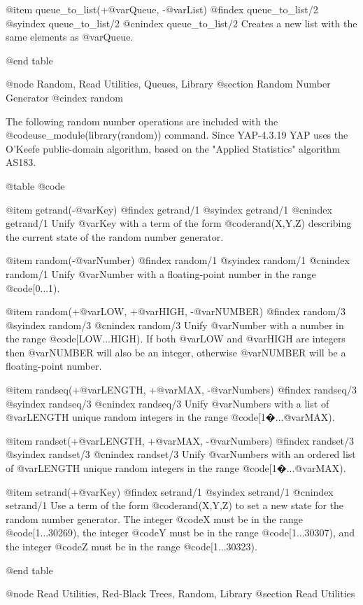 {{{{{{{{@item queue_to_list(+@var{Queue}, -@var{List})
@findex queue_to_list/2
@syindex queue_to_list/2
@cnindex queue_to_list/2
Creates a new list with the same elements as @var{Queue}.

@end table


@node Random, Read Utilities, Queues, Library
@section Random Number Generator
@cindex random

The following random number operations are included with the
@code{use_module(library(random))} command. Since YAP-4.3.19 YAP uses
the O'Keefe public-domain algorithm, based on the "Applied Statistics"
algorithm AS183.

@table @code

@item getrand(-@var{Key})
@findex getrand/1
@syindex getrand/1
@cnindex getrand/1
Unify @var{Key} with a term of the form @code{rand(X,Y,Z)} describing the
current state of the random number generator.

@item random(-@var{Number})
@findex random/1
@syindex random/1
@cnindex random/1
Unify @var{Number} with a floating-point number in the range @code{[0...1)}.

@item random(+@var{LOW}, +@var{HIGH}, -@var{NUMBER})
@findex random/3
@syindex random/3
@cnindex random/3
Unify @var{Number} with a number in the range
@code{[LOW...HIGH)}. If both @var{LOW} and @var{HIGH} are
integers then @var{NUMBER} will also be an integer, otherwise
@var{NUMBER} will be a floating-point number.

@item randseq(+@var{LENGTH}, +@var{MAX}, -@var{Numbers})
@findex randseq/3
@syindex randseq/3
@cnindex randseq/3
Unify @var{Numbers} with a list of @var{LENGTH} unique random integers
in the range @code{[1�...@var{MAX})}.

@item randset(+@var{LENGTH}, +@var{MAX}, -@var{Numbers})
@findex randset/3
@syindex randset/3
@cnindex randset/3
Unify @var{Numbers} with an ordered list of @var{LENGTH} unique random
integers in the range @code{[1�...@var{MAX})}.

@item setrand(+@var{Key})
@findex setrand/1
@syindex setrand/1
@cnindex setrand/1
Use a term of the form @code{rand(X,Y,Z)} to set a new state for the
random number generator. The integer @code{X} must be in the range
@code{[1...30269)}, the integer @code{Y} must be in the range
@code{[1...30307)}, and the integer @code{Z} must be in the range
@code{[1...30323)}.

@end table

@node Read Utilities, Red-Black Trees, Random, Library
@section Read Utilities

}}}}}}}}
